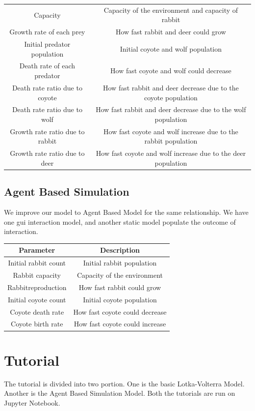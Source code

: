 \documentclass{article}
\begin{document}
\begin{normalsize}
\begin{center}
\begin{tabular}{ |c|c|}
			Capacity & Capacity of the environment and capacity of rabbit\\ 
			Growth rate of each prey & How fast rabbit and deer could grow \\ 
			Initial predator population & Initial coyote and wolf population \\ 
			Death rate of each predator & How fast coyote and wolf could decrease \\ 
			Death rate ratio due to coyote & How fast rabbit and deer decrease due to the coyote population \\
			Death rate ratio due to wolf & How fast rabbit and deer decrease due to the wolf population \\			
			Growth rate ratio due to rabbit & How fast coyote and wolf increase due to the rabbit population\\
			Growth rate ratio due to deer & How fast coyote and wolf increase due to the deer population\\
			\hline
		\end{tabular}
	\end{center}
		
		\subsection{Agent Based Simulation}
		
		We improve our model to Agent Based Model for the same relationship. We have one gui interaction model, and another static model populate the outcome of interaction.
		
			\begin{center}
			\begin{tabular}{ |c|c|} 
				\hline
				Parameter & Description  \\ 
				\hline
				Initial rabbit count & Initial rabbit population  \\ 
				Rabbit capacity & Capacity of the environment\\ 
				Rabbitreproduction & How fast rabbit could grow \\ 
				Initial coyote count & Initial coyote population \\ 
				Coyote death rate & How fast coyote could decrease \\ 
				Coyote birth rate  & How fast coyote could increase \\ 
				\hline
			\end{tabular}
		\end{center}
		
		\section{Tutorial}
		The tutorial is divided into two portion. One is the basic Lotka-Volterra Model. Another is the Agent Based Simulation Model. Both the tutorials are run on Jupyter Notebook.

\end{normalsize}
\end{document}
